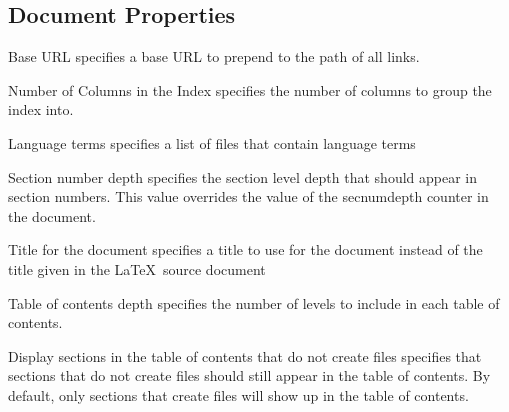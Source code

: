 \subsection{Document Properties\label{sec:config-document}}

\begin{configuration}{Base URL}
specifies a base URL to prepend to the path of all links.
\end{configuration}

\begin{configuration}{Number of Columns in the Index}
specifies the number of columns to group the index into.
\end{configuration}

\begin{configuration}{Language terms}
specifies a list of files that contain language terms
\end{configuration}

\begin{configuration}{Section number depth}
specifies the section level depth that should appear in section numbers.
This value overrides the value of the secnumdepth counter in the document.
\end{configuration}

\begin{configuration}{Title for the document}
specifies a title to use for the document instead of the title given
in the \LaTeX\ source document
\end{configuration}

\begin{configuration}{Table of contents depth}
specifies the number of levels to include in each table of contents.
\end{configuration}

\begin{configuration}{Display sections in the table of contents that do not create files}
specifies that sections that do not create files should still appear in the
table of contents.  By default, only sections that create files will show
up in the table of contents.
\end{configuration}

